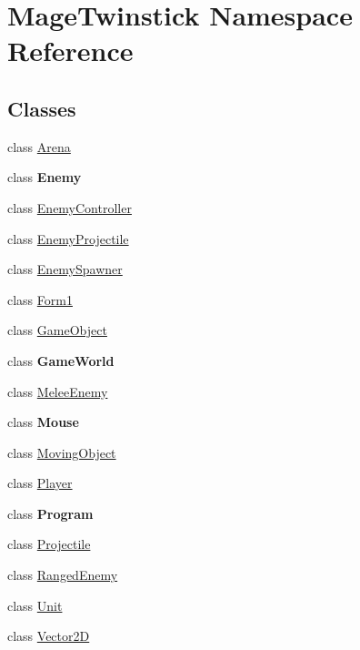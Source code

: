 \hypertarget{namespace_mage_twinstick}{}\section{Mage\+Twinstick Namespace Reference}
\label{namespace_mage_twinstick}
\subsection*{Classes}
\begin{DoxyCompactItemize}
\item 
class \hyperlink{class_mage_twinstick_1_1_arena}{Arena}
\item 
class {\bfseries Enemy}
\item 
class \hyperlink{class_mage_twinstick_1_1_enemy_controller}{Enemy\+Controller}
\item 
class \hyperlink{class_mage_twinstick_1_1_enemy_projectile}{Enemy\+Projectile}
\item 
class \hyperlink{class_mage_twinstick_1_1_enemy_spawner}{Enemy\+Spawner}
\item 
class \hyperlink{class_mage_twinstick_1_1_form1}{Form1}
\item 
class \hyperlink{class_mage_twinstick_1_1_game_object}{Game\+Object}
\item 
class {\bfseries Game\+World}
\item 
class \hyperlink{class_mage_twinstick_1_1_melee_enemy}{Melee\+Enemy}
\item 
class {\bfseries Mouse}
\item 
class \hyperlink{class_mage_twinstick_1_1_moving_object}{Moving\+Object}
\item 
class \hyperlink{class_mage_twinstick_1_1_player}{Player}
\item 
class {\bfseries Program}
\item 
class \hyperlink{class_mage_twinstick_1_1_projectile}{Projectile}
\item 
class \hyperlink{class_mage_twinstick_1_1_ranged_enemy}{Ranged\+Enemy}
\item 
class \hyperlink{class_mage_twinstick_1_1_unit}{Unit}
\item 
class \hyperlink{class_mage_twinstick_1_1_vector2_d}{Vector2\+D}
\end{DoxyCompactItemize}
